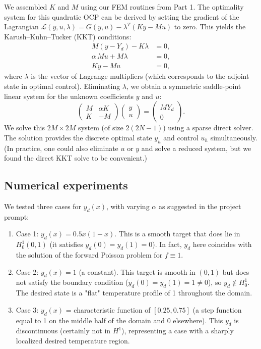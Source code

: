 We assembled $K$ and $M$ using our FEM routines from Part 1. The optimality system for this quadratic OCP can be derived by setting the gradient of the Lagrangian $\mathcal{L}(y,u,\lambda) = G(y,u) - \lambda^T(Ky - Mu)$ to zero. This yields the Karush–Kuhn–Tucker (KKT) conditions:
\begin{align*}
	M(y-Y_d) - K\lambda   & = 0, \\
	\alpha\,Mu + M\lambda & = 0, \\
	Ky-Mu                 & = 0,
\end{align*}
where $\lambda$ is the vector of Lagrange multipliers (which corresponds to the adjoint state in optimal control). Eliminating $\lambda$, we obtain a symmetric saddle-point linear system for the unknown coefficients $y$ and $u$:
\[
	\begin{pmatrix}
		M & \alpha K \\
		K & -M
	\end{pmatrix}
	\begin{pmatrix}
		y \\
		u
	\end{pmatrix}
	=
	\begin{pmatrix}
		MY_d \\
		0
	\end{pmatrix}.
\]
We solve this $2M \times 2M$ system (of size $2(2N-1)$) using a sparse direct solver. The solution provides the discrete optimal state $y_h$ and control $u_h$ simultaneously. (In practice, one could also eliminate $u$ or $y$ and solve a reduced system, but we found the direct KKT solve to be convenient.)

\subsection{Numerical experiments} We tested three cases for $y_d(x)$, with varying $\alpha$ as suggested in the project prompt:

\begin{enumerate}
	\item Case 1: $y_d(x) = 0.5x(1-x)$. This is a smooth target that does lie in $H^1_0(0,1)$ (it satisfies $y_d(0)=y_d(1)=0$). In fact, $y_d$ here coincides with the solution of the forward Poisson problem for $f\equiv 1$.
	\item Case 2: $y_d(x) = 1$ (a constant). This target is smooth in $(0,1)$ but does not satisfy the boundary condition ($y_d(0)=y_d(1)=1\neq0$), so $y_d\notin H^1_0$. The desired state is a "flat" temperature profile of 1 throughout the domain.
	\item Case 3: $y_d(x)$ = characteristic function of $[0.25,0.75]$ (a step function equal to 1 on the middle half of the domain and 0 elsewhere). This $y_d$ is discontinuous (certainly not in $H^1$), representing a case with a sharply localized desired temperature region.
\end{enumerate}

